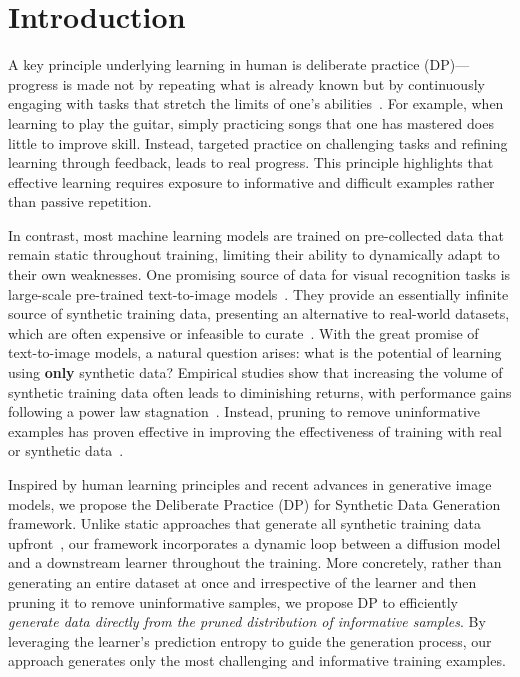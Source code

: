 \section{Introduction}

A key principle underlying learning in human is deliberate practice (DP)—progress is made not by repeating what is already known but by continuously engaging with tasks that stretch the limits of one’s abilities~\citep{ericsson1993role}. For example, when learning to play the guitar, simply practicing songs that one has mastered does little to improve skill. Instead, targeted practice on challenging tasks and refining learning through feedback, leads to real progress. This principle highlights that effective learning requires exposure to informative and difficult examples rather than passive repetition.

In contrast, most machine learning models are trained on pre-collected data that remain static throughout training, limiting their ability to dynamically adapt to their own weaknesses. One promising source of data for visual recognition tasks is large-scale pre-trained text-to-image models~\citep{rombach2022high}. They provide an essentially infinite source of synthetic training data, presenting an alternative to real-world datasets, which are often expensive or infeasible to curate~\citep{hemmat2023feedback, shin2023fill, zhang2024expanding}. With the great promise of text-to-image models, a natural question arises: what is the potential of learning using \textbf{only} synthetic data? Empirical studies show that increasing the volume of synthetic training data often leads to diminishing returns, with performance gains following a power law stagnation~\citep{fan2024scaling, tian2024learning}. Instead, pruning to remove uninformative examples has proven effective in improving the effectiveness of training with real or synthetic data~\citep{sorscher2022beyond,kolossov2024towards, feng2024modelcollapsescalingsynthesized}. 

Inspired by human learning principles and recent advances in generative image models, we propose the Deliberate Practice (DP) for Synthetic Data Generation framework. Unlike static approaches that generate all synthetic training data upfront~\citep{fan2024scaling, shin2023fill, hemmat2023feedback}, our framework incorporates a dynamic loop between a diffusion model and a downstream learner throughout the training. More concretely, rather than generating an entire dataset at once and irrespective of the learner and then pruning it to remove uninformative samples, we propose DP to efficiently \emph{generate data directly from the pruned distribution of informative samples}. By leveraging the learner's prediction entropy to guide the generation process, our approach generates only the most challenging and informative training examples.

